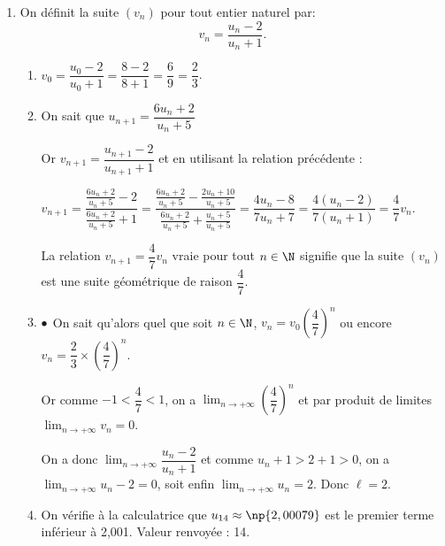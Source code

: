 \begin{enumerate}
\begin{enumerate}
Le signe du quotient précédent est donc celui de $2 - u_n$ ; or $u_n > 2 \implies $

$0 > 2 - u_n$, donc $u_{n+1} - u_n < 0$ ce qui signifie que la suite $\left(u_n\right)$ est décroissante.
		\item 
La suite $\left(u_n\right)$ étant décroissante et minorée par 2 est donc convergente vers une limite $\ell$, avec $\ell \geqslant 2$.
	\end{enumerate}
\item On définit la suite $\left(v_n\right)$ pour tout entier naturel par:
\[v_n = \dfrac{u_n - 2}{u_n + 1}.\]

	\begin{enumerate}
		\item 
$v_0 = \dfrac{u_0 - 2}{u_0 + 1} = \dfrac{8 - 2}{8 + 1} = \dfrac{6}{9} = \dfrac{2}{3}$.
		\item 
On sait que $u_{n +1} = \dfrac{6u_n + 2}{u_n +5}$
		
Or $v_{n+1} = \dfrac{u_{n+1} - 2}{u_{n+1} + 1}$ et en utilisant la relation précédente :

$v_{n+1} =  \dfrac{\frac{6u_n + 2}{u_n + 5} - 2}{\frac{6u_n + 2}{u_n + 5} + 1} = \dfrac{\frac{6u_n + 2}{u_n + 5} - \frac{2u_n + 10}{u_n + 5}}{\frac{6u_n + 2}{u_n + 5} + \frac{u_n + 5}{u_n + 5}} =\dfrac{4u_n - 8}{7u_n + 7} = \dfrac{4\left(u_n - 2\right)}{7\left(u_n + 1\right)} = \dfrac47 v_n$.

La relation $v_{n+1} = \dfrac47v_n$ vraie pour tout $n \in \N$ signifie que la suite $\left(v_n\right)$ est une suite géométrique de raison $\dfrac47$.
		\item 
$\bullet~~$On sait qu'alors quel que soit $n \in \N$, \: $v_n = v_0\left(\dfrac47\right)^n$ ou encore $v_n = \dfrac{2}{3}\times \left(\dfrac47\right)^n$.

Or comme $- 1 < \dfrac{4}{7} < 1$, on a $\displaystyle\lim_{n \to + \infty} \left(\dfrac47\right)^n$ et par produit de limites $\displaystyle\lim_{n \to + \infty}v_n = 0$.


On a donc $\displaystyle\lim_{n \to + \infty} \dfrac{u_n - 2}{u_n + 1}$ et comme $u_n + 1 > 2 + 1 > 0$, on a $\displaystyle\lim_{n \to + \infty} u_n - 2 = 0$, soit enfin $\displaystyle\lim_{n \to + \infty} u_n = 2$. Donc $\ell = 2$.























\item On vérifie à la calculatrice que $u_{14} \approx \np{2,00079}$ est le premier terme inférieur à 2,001. Valeur renvoyée : 14.
	\end{enumerate}
\end{enumerate}

\bigskip
